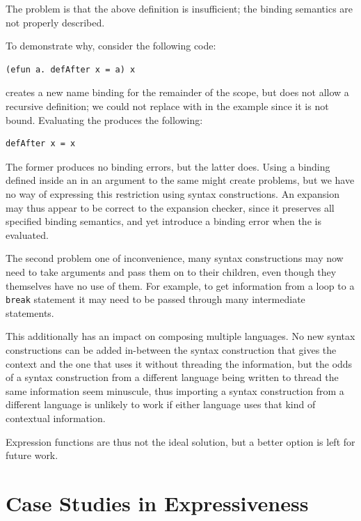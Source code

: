 \documentclass{kththesis}
\begin{document}
The problem is that the above definition is insufficient; the binding semantics are not properly described.

To demonstrate why, consider the following code:

\begin{verbatim}
(efun a. defAfter x = a) x
\end{verbatim}

 creates a new name binding for the remainder of the scope, but does not allow a recursive definition; we could not replace  with  in the example since it is not bound. Evaluating the  produces the following:

\begin{verbatim}
defAfter x = x
\end{verbatim}

The former produces no binding errors, but the latter does. Using a binding defined inside an  in an argument to the same  might create problems, but we have no way of expressing this restriction using syntax constructions. An expansion may thus appear to be correct to the expansion checker, since it preserves all specified binding semantics, and yet introduce a binding error when the  is evaluated.

The second problem one of inconvenience, many syntax constructions may now need to take arguments and pass them on to their children, even though they themselves have no use of them. For example, to get information from a loop to a \texttt{break} statement it may need to be passed through many intermediate statements.

This additionally has an impact on composing multiple languages. No new syntax constructions can be added in-between the syntax construction that gives the context and the one that uses it without threading the information, but the odds of a syntax construction from a different language being written to thread the same information seem minuscule, thus importing a syntax construction from a different language is unlikely to work if either language uses that kind of contextual information.

Expression functions are thus not the ideal solution, but a better option is left for future work.

\section{Case Studies in Expressiveness} \label{sec:case-studies}
\end{document}
